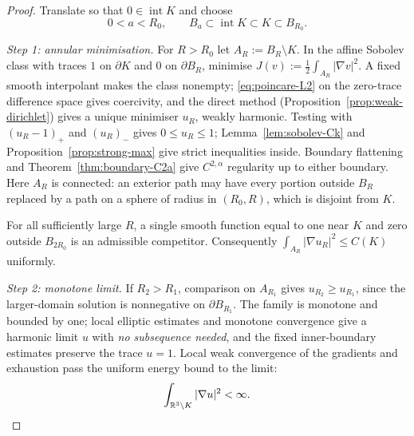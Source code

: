 \begin{proof}
Translate so that $0\in\operatorname{int}K$ and choose
\begin{equation}\label{eq:hull-radii}
  0<a<R_0,\qquad B_a\subset\operatorname{int}K\subset K\subset B_{R_0}.
\end{equation}

\emph{Step 1: annular minimisation.}  For $R>R_0$ let
$A_R:=B_R\setminus K$.  In the affine Sobolev class with traces $1$ on
$\partial K$ and $0$ on $\partial B_R$, minimise
$J(v):=\tfrac12\int_{A_R}|\nabla v|^2$.  A fixed smooth interpolant makes the
class nonempty; \eqref{eq:poincare-L2} on the zero-trace difference space gives
coercivity, and the direct method
(Proposition~\ref{prop:weak-dirichlet}) gives a unique minimiser $u_R$, weakly
harmonic.  Testing with $(u_R-1)_+$ and $(u_R)_-$ gives $0\le u_R\le1$;
Lemma~\ref{lem:sobolev-Ck} and Proposition~\ref{prop:strong-max} give strict
inequalities inside.  Boundary flattening and
Theorem~\ref{thm:boundary-C2a} give $C^{2,\alpha}$ regularity up to either
boundary.  Here $A_R$ is connected: an exterior path may have every portion
outside $B_R$ replaced by a path on a sphere of radius in $(R_0,R)$, which is
disjoint from $K$.

For all sufficiently large $R$, a single smooth function equal to one near
$K$ and zero outside $B_{2R_0}$ is an admissible competitor.  Consequently
$\int_{A_R}|\nabla u_R|^2\le C(K)$ uniformly.

\emph{Step 2: monotone limit.}  If $R_2>R_1$, comparison on $A_{R_1}$ gives
$u_{R_2}\ge u_{R_1}$, since the larger-domain solution is nonnegative on
$\partial B_{R_1}$.  The family is monotone and bounded by one; local elliptic
estimates and monotone convergence give a harmonic limit $u$ with \emph{no
subsequence needed}, and the fixed inner-boundary estimates preserve the trace
$u=1$.  Local weak convergence of the gradients and exhaustion pass the
uniform energy bound to the limit:
\begin{equation}\label{eq:capacity-finite-energy}
 \int_{\mathbb R^3\setminus K}|\nabla u|^2<\infty .
\end{equation}


\end{proof}

